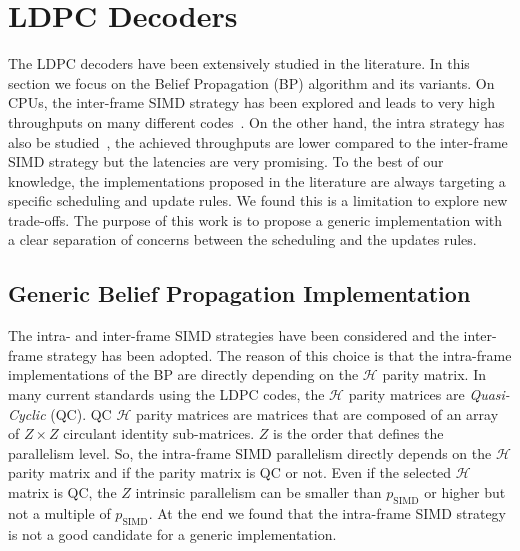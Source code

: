\section{LDPC Decoders}
\label{sec:opt_ldpc}

The LDPC decoders have been extensively studied in the literature. In this
section we focus on the Belief Propagation (BP) algorithm and its variants. On
CPUs, the inter-frame SIMD strategy has been explored and leads to very high
throughputs on many different codes~\cite{LeGal2016}. On the other hand, the
intra strategy has also be studied~\cite{LeGal2019a,Xu2019}, the achieved
throughputs are lower compared to the inter-frame SIMD strategy but the
latencies are very promising. To the best of our knowledge, the implementations
proposed in the literature are always targeting a specific scheduling and update
rules. We found this is a limitation to explore new trade-offs. The purpose of
this work is to propose a generic implementation with a clear separation of
concerns between the scheduling and the updates rules.

\subsection{Generic Belief Propagation Implementation}

The intra- and inter-frame SIMD strategies have been considered and the
inter-frame strategy has been adopted. The reason of this choice is that
the intra-frame implementations of the BP are directly depending on the
$\mathcal{H}$ parity matrix. In many current standards using the LDPC codes, the
$\mathcal{H}$ parity matrices are \emph{Quasi-Cyclic} (QC). QC $\mathcal{H}$
parity matrices are matrices that are composed of an array of $Z \times Z$
circulant identity sub-matrices. $Z$ is the order that defines the parallelism
level. So, the intra-frame SIMD parallelism directly depends on the
$\mathcal{H}$ parity matrix and if the parity matrix is QC or not. Even if the
selected $\mathcal{H}$ matrix is QC, the $Z$ intrinsic parallelism can be
smaller than $p_\text{SIMD}$ or higher but not a multiple of $p_\text{SIMD}$. At
the end we found that the intra-frame SIMD strategy is not a good candidate for
a generic implementation.

